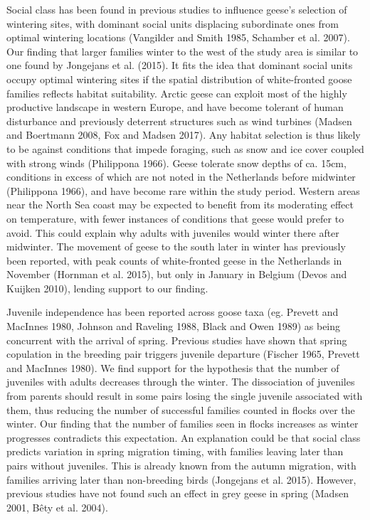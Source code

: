 \documentclass[10pt,twocolumn]{paper}
\begin{document}
Social class has been found in previous studies to influence geese's
selection of wintering sites, with dominant social units displacing
subordinate ones from optimal wintering locations (Vangilder and Smith
1985, Schamber et al. 2007). Our finding that larger families winter to
the west of the study area is similar to one found by Jongejans et al.
(2015). It fits the idea that dominant social units occupy optimal
wintering sites if the spatial distribution of white-fronted goose
families reflects habitat suitability. Arctic geese can exploit most of
the highly productive landscape in western Europe, and have become
tolerant of human disturbance and previously deterrent structures such
as wind turbines (Madsen and Boertmann 2008, Fox and Madsen 2017). Any
habitat selection is thus likely to be against conditions that impede
foraging, such as snow and ice cover coupled with strong winds
(Philippona 1966). Geese tolerate snow depths of ca. 15cm, conditions in
excess of which are not noted in the Netherlands before midwinter
(Philippona 1966), and have become rare within the study period. Western
areas near the North Sea coast may be expected to benefit from its
moderating effect on temperature, with fewer instances of conditions
that geese would prefer to avoid. This could explain why adults with
juveniles would winter there after midwinter. The movement of geese to
the south later in winter has previously been reported, with peak counts
of white-fronted geese in the Netherlands in November (Hornman et al.
2015), but only in January in Belgium (Devos and Kuijken 2010), lending
support to our finding.

Juvenile independence has been reported across goose taxa (eg. Prevett
and MacInnes 1980, Johnson and Raveling 1988, Black and Owen 1989) as
being concurrent with the arrival of spring. Previous studies have shown
that spring copulation in the breeding pair triggers juvenile departure
(Fischer 1965, Prevett and MacInnes 1980). We find support for the
hypothesis that the number of juveniles with adults decreases through
the winter. The dissociation of juveniles from parents should result in
some pairs losing the single juvenile associated with them, thus
reducing the number of successful families counted in flocks over the
winter. Our finding that the number of families seen in flocks increases
as winter progresses contradicts this expectation. An explanation could
be that social class predicts variation in spring migration timing, with
families leaving later than pairs without juveniles. This is already
known from the autumn migration, with families arriving later than
non-breeding birds (Jongejans et al. 2015). However, previous studies
have not found such an effect in grey geese in spring (Madsen 2001, Bêty
et al. 2004).
\end{document}
